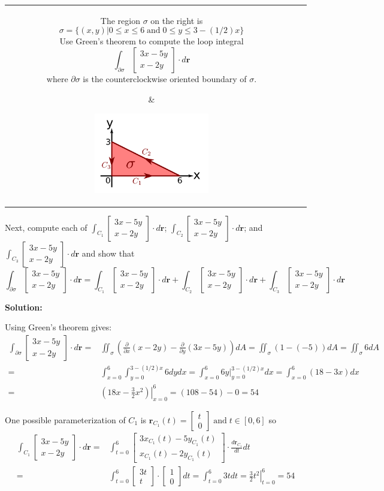 \documentclass{article}
\newcommand{\colxyvec}[2]{\begin{bmatrix} #1 \\ #2 \end{bmatrix}}
\newcommand{\at}[1]{\left. #1 \right|}
\newcommand{\dr}[1]{\textcolor{dark_red}{#1}}
\begin{document}
\begin{tabular}{cc}
\parbox{0.6\textwidth}{ 
The region \(\sigma\) on the right is 
\[\sigma = \{(x,y) | 0 \leq x \leq 6 \;\text{and}\; 0 \leq y \leq 3 - (1/2)x\}\]
Use Green's theorem to compute the loop integral
\[\int_{\partial\sigma} \colxyvec{3x-5y}{x-2y} \cdot d\mathbf{r}\]
where \(\partial\sigma\) is the counterclockwise oriented boundary of \(\sigma\).
} & \parbox{0.4\textwidth}{
\includegraphics[width = 0.4\textwidth]{Test_bench_part_4x_images/Test_bench_part_4x_image_1}
}
\end{tabular}
Next, compute each of \(\int_{C_1} \colxyvec{3x-5y}{x-2y} \cdot d\mathbf{r}\); \(\int_{C_2} \colxyvec{3x-5y}{x-2y} \cdot d\mathbf{r}\); and \(\int_{C_3} \colxyvec{3x-5y}{x-2y} \cdot d\mathbf{r}\) and show that 
\[\int_{\partial\sigma} \colxyvec{3x-5y}{x-2y} \cdot d\mathbf{r} = \int_{C_1} \colxyvec{3x-5y}{x-2y} \cdot d\mathbf{r} + \int_{C_2} \colxyvec{3x-5y}{x-2y} \cdot d\mathbf{r} + \int_{C_3} \colxyvec{3x-5y}{x-2y} \cdot d\mathbf{r}\]  

\vspace{5mm}
\dr{\textbf{Solution:}}

\dr{Using Green's theorem gives:
\begin{align*} 
\int_{\partial\sigma} \colxyvec{3x-5y}{x-2y} \cdot d\mathbf{r} = & \iint_{\sigma} (\frac{\partial}{\partial x}(x - 2y) - \frac{\partial}{\partial y}(3x - 5y))dA 
= \iint_{\sigma} (1 - (-5))dA 
= \iint_{\sigma} 6dA \\
= & \int_{x=0}^6 \int_{y=0}^{3 - (1/2)x} 6 dydx 
= \int_{x=0}^6 \at{6y}_{y=0}^{3 - (1/2)x} dx  
= \int_{x=0}^6 (18 - 3x)dx \\
= & \at{(18x - \frac{3}{2}x^2)}_{x=0}^6   
= (108 - 54) - 0 
= 54
\end{align*}}  

\dr{One possible parameterization of \(C_1\) is \(\mathbf{r}_{C_1}(t) = \colxyvec{t}{0} \;\text{and}\; t \in [0,6]\) so
\begin{align*}
\int_{C_1} \colxyvec{3x-5y}{x-2y} \cdot d\mathbf{r} = & \int_{t=0}^6 \colxyvec{3x_{C_1}(t) - 5y_{C_1}(t)}{x_{C_1}(t) - 2y_{C_1}(t)} \cdot \frac{d\mathbf{r}_{C_1}}{dt}dt \\
= & \int_{t=0}^6 \colxyvec{3t}{t} \cdot \colxyvec{1}{0}dt 
= \int_{t=0}^6 3t dt 
= \at{\frac{3}{2}t^2}_{t=0}^6 
= 54
\end{align*}}
\end{document}
